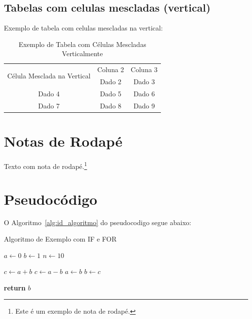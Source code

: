 \subsection{Tabelas com celulas mescladas (vertical)}

Exemplo de tabela com celulas mescladas na vertical:

\begin{table}[!htb]
\centering
\begin{tabular}{|c|c|c|}
\hline
\multirow{2}{*}{Célula Mesclada na Vertical} & Coluna 2 & Coluna 3 \\ 
\cline{2-3}
         & Dado 2   & Dado 3   \\
\hline
Dado 4   & Dado 5   & Dado 6   \\
\hline
Dado 7   & Dado 8   & Dado 9   \\
\hline
\end{tabular}
\caption{Exemplo de Tabela com Células Mescladas Verticalmente}
\label{tab:tabela_vertical}
\end{table}

\section{Notas de Rodapé}

Texto com nota de rodapé.\footnote{Este é um exemplo de nota de rodapé.}

\section{Pseudocódigo}

O Algoritmo~\ref{alg:id_algoritmo} do pseudocodigo segue abaixo:

\begin{algorithm}
\caption{Algoritmo de Exemplo com IF e FOR}
\label{alg:id_algoritmo}
\begin{algorithmic}[1] %
    \State $a \gets 0$ 
    \State $b \gets 1$ 
    \State $n \gets 10$ 
    
     
         
            \State $c \gets a + b$ 
        \Else
            \State $c \gets a - b$ 
        \EndIf
        \State $a \gets b$ 
        \State $b \gets c$ 
    \EndFor

    \State \textbf{return} $b$ 
\end{algorithmic}
\end{algorithm}

